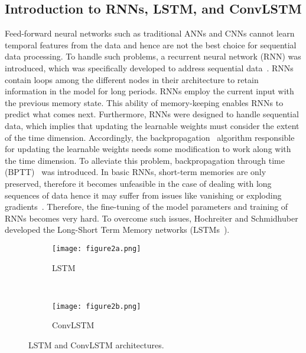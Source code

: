 \subsection{Introduction to RNNs, LSTM, and ConvLSTM}
Feed-forward neural networks such as traditional ANNs and CNNs cannot learn temporal features from the data and hence are not the best choice for sequential data processing.
To handle such problems, a recurrent neural network (RNN) was introduced, which was specifically developed to address sequential data~\cite{aggarwal2018neural, Lecun2015, goodfellow2016deep}. 
RNNs contain loops among the different nodes in their architecture to retain information in the model for long periods.
RNNs employ the current input with the previous memory state.
This ability of memory-keeping enables RNNs to predict what comes next. 
Furthermore, RNNs were designed to handle sequential data, which implies that updating the learnable weights must consider the extent of the time dimension. 
Accordingly, the backpropagation~\cite{Rumelhart1986} algorithm responsible for updating the learnable weights needs some modification to work along with the time dimension.
To alleviate this problem, backpropagation through time (BPTT)~\cite{aggarwal2018neural, goodfellow2016deep} was introduced. 
In basic RNNs, short-term memories are only preserved, therefore it becomes unfeasible in the case of dealing with long sequences of data hence it may suffer from issues like vanishing or exploding gradients~\cite{bengio1994learning}.
Therefore, the fine-tuning of the model parameters and training of RNNs becomes very hard.
To overcome such issues, Hochreiter and Schmidhuber developed the Long-Short Term Memory networks (LSTMs~\cite{Hochreiter1997}).
\begin{figure} [!h]
	\centering
	\begin{subfigure}[b]{1\textwidth}
		\centering
		\texttt{[image: figure2a.png]}
		\caption{LSTM}
		\label{fig:LSTM}
	\end{subfigure}
	\\ 
	\hfill
	\begin{subfigure}[b]{1\textwidth}
		\centering
		\texttt{[image: figure2b.png]}
		\caption{ConvLSTM}
		\label{fig:ConvLSTM}	
	\end{subfigure}
	\caption{LSTM and ConvLSTM architectures.}
	\label{fig:lstm_convlstm}
\end{figure}

